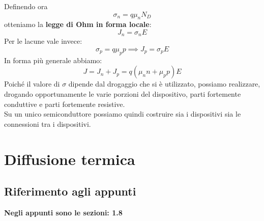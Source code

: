 \documentclass{article}
\numberwithin{equation}{subsection}
\begin{document}
	Definendo ora
	$$\sigma_n = q\mu_n N_D$$
	otteniamo la \textbf{legge di Ohm in forma locale}:
	$$J_n = \sigma_n E$$
	Per le lacune vale invece:
	$$\sigma_p = q\mu_p p \implies J_p = \sigma_p E$$
	In forma più generale abbiamo:
	$$J = J_n + J_p = q(\mu_n n + \mu_p p)E$$
	Poiché il valore di $\sigma$ dipende dal drogaggio che si è utilizzato, possiamo realizzare, drogando opportunamente le varie porzioni del dispositivo, parti fortemente conduttive e parti fortemente resistive. \\
	Su un unico semiconduttore possiamo quindi costruire sia i dispositivi sia le connessioni tra i dispositivi.
	\section{Diffusione termica}
	\subsection{Riferimento agli appunti}
	\textbf{Negli appunti sono le sezioni: 1.8}
\end{document}
